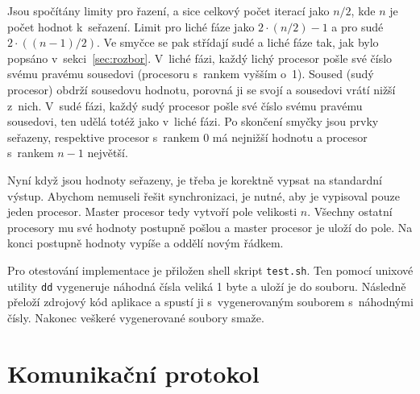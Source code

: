 \documentclass[11pt, a4paper, titlepage]{article}
\begin{document}
Jsou spočítány limity pro řazení, a sice celkový počet iterací jako $n/2$, kde $n$ je počet hodnot k~seřazení.
Limit pro liché fáze jako $2 \cdot (n/2) - 1$ a pro sudé $2 \cdot ((n - 1) / 2)$.
Ve smyčce se pak střídají sudé a liché fáze tak, jak bylo popsáno v~sekci~\ref{sec:rozbor}.
V~liché fázi, každý lichý procesor pošle své číslo svému pravému sousedovi (procesoru s~rankem vyšším o~1).
Soused (sudý procesor) obdrží sousedovu hodnotu, porovná ji se svojí a sousedovi vrátí nižší z~nich.
V~sudé fázi, každý sudý procesor pošle své číslo svému pravému sousedovi, ten udělá totéž jako v~liché fázi.
Po skončení smyčky jsou prvky seřazeny, respektive procesor s~rankem $0$ má nejnižší hodnotu a procesor s~rankem $n-1$ největší.

Nyní když jsou hodnoty seřazeny, je třeba je korektně vypsat na standardní výstup.
Abychom nemuseli řešit synchronizaci, je nutné, aby je vypisoval pouze jeden procesor.
Master procesor tedy vytvoří pole velikosti $n$.
Všechny ostatní procesory mu své hodnoty postupně pošlou a master procesor je uloží do pole.
Na konci postupně hodnoty vypíše a oddělí novým řádkem.

Pro otestování implementace je přiložen shell skript \texttt{test.sh}.
Ten pomocí unixové utility \texttt{dd} vygeneruje náhodná čísla veliká 1 byte a uloží je do souboru.
Následně přeloží zdrojový kód aplikace a spustí ji s~vygenerovaným souborem s~náhodnými čísly.
Nakonec veškeré vygenerované soubory smaže.


\section{Komunikační protokol}\label{sec:protokol}
\end{document}
